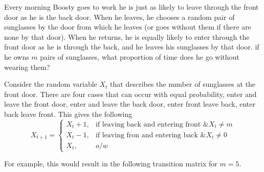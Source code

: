 \documentclass[10pt,a4paper]{exam}
\begin{document}
\begin{questions}

\pagebreak

\question Every morning Boosty goes to work he is just as likely to leave through the front door as he is the back door. When he leaves, he chooses a random pair of sunglasses by the door from which he leaves (or goes without them if there are none by that door). When he returns, he is equally likely to enter through the front door as he is through the back, and he leaves his sunglasses by that door. if he owns $m$ pairs of sunglasses, what proportion of time does he go without wearing them?

\begin{solution}
Consider the random variable $X_t$ that describes the number of sunglasses at the front door. There are four cases that can occur with equal probability, enter and leave the front door, enter and leave the back door, enter front leave back, enter back leave front. This gives the following
$$X_{t+1} = \begin{cases}
X_t + 1, & \text{if leaving back and entering front \& } X_t \neq m\\
X_t - 1, & \text{if leaving fron and entering back \& } X_t \neq 0\\
X_t, & o/w
\end{cases}$$

For example, this would result in the following transition matrix for $m = 5$.


\end{solution}
\end{questions}
\end{document}
